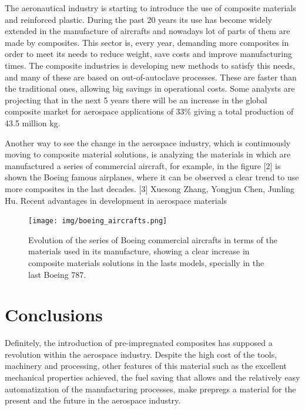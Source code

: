 The aeronautical industry is starting to introduce the use of composite materials
and reinforced plastic. During the past 20 years its use has become widely extended
in the manufacture of aircrafts and nowadays lot of parts of them are made by composites.
This sector is, every year, demanding more composites in order to meet its needs
to reduce weight, save costs and improve manufacturing times. The composite industries
is developing new methods to satisfy this needs, and many of these are based on
out-of-autoclave processes. These are faster than the traditional ones, allowing
big savings in operational costs. Some analysts are projecting that in the next
5 years there will be an increase in the global composite market for aerospace
applications of  33\% giving a total production of 43.5 million kg. \cite{2}

Another way to see the change in the aerospace industry, which is continuously
moving to composite material solutions, is analyzing the materials in which are
manufactured a series of commercial aircraft, for example, in the figure [2] is
shown the Boeing famous airplanes, where it can be observed a clear trend to use
more composites in the last decades\cite{3}.
[3] Xuesong Zhang, Yongjun Chen, Junling Hu. Recent advantages in development in aerospace materials

\begin{figure}[h]
	\centering
	\texttt{[image: img/boeing\_aircrafts.png]}
	\caption[Carbon fiber prepreg roll]{Evolution of the
	series of Boeing commercial aircrafts in terms of the materials used in
	its manufacture, showing a clear increase in composite materials solutions
	in the lasts models, specially in the last Boeing 787. \cite{3}}
	\label{fig:prepreg_roll}
\end{figure}

\section{Conclusions}

Definitely, the introduction of pre-impregnated composites has supposed a
revolution within the aerospace industry. Despite the high cost of the tools,
machinery and processing, other features of this material such as the excellent
mechanical properties achieved, the fuel saving that allows and the relatively
easy automatization of the manufacturing processes, make prepregs a material for
the present and the future in the aerospace industry.\\

